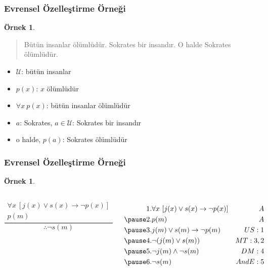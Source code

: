 \documentclass[dvipsnames]{beamer}
\theoremstyle{definition}
\theoremstyle{example}
\newtheorem{ornek}[theorem]{Örnek}
\theoremstyle{plain}
\begin{document}
\begin{frame}
  \frametitle{Evrensel Özelleştirme Örneği}

  \begin{ornek}
    \begin{quote}
      Bütün insanlar ölümlüdür. Sokrates bir insandır. O halde Sokrates
      ölümlüdür.
    \end{quote}

    \pause
    \begin{itemize}
      \item $\mathcal{U}$: bütün insanlar
      \item $p(x)$: $x$ ölümlüdür
      \item $\forall x~p(x)$: bütün insanlar ölümlüdür
      \item $a$: Sokrates, $a \in \mathcal{U}$: Sokrates bir insandır
      \item o halde, $p(a)$: Sokrates ölümlüdür
    \end{itemize}
  \end{ornek}
\end{frame}

\begin{frame}
  \frametitle{Evrensel Özelleştirme Örneği}

  \begin{ornek}
    \begin{columns}
      \[
      \frac
        {
          \begin{array}{c}
            \forall x~[j(x) \vee s(x) \rightarrow \neg p(x)]\\
            p(m)
          \end{array}
        }
        {
          \therefore \neg s(m)
        }
      \]

      \pause
      \begin{eqnarray*}
        1. & \forall x~[j(x) \vee s(x) \rightarrow \neg p(x)] & A\\\pause
        2. & p(m)                                             & A\\\pause
        3. & j(m) \vee s(m) \rightarrow \neg p(m)             & US:1\\\pause
        4. & \neg (j(m) \vee s(m))                            & MT:3,2\\\pause
        5. & \neg j(m) \wedge \neg s(m)                       & DM:4\\\pause
        6. & \neg s(m)                                        & AndE:5
      \end{eqnarray*}
    \end{columns}
  \end{ornek}
\end{frame}
\end{document}
